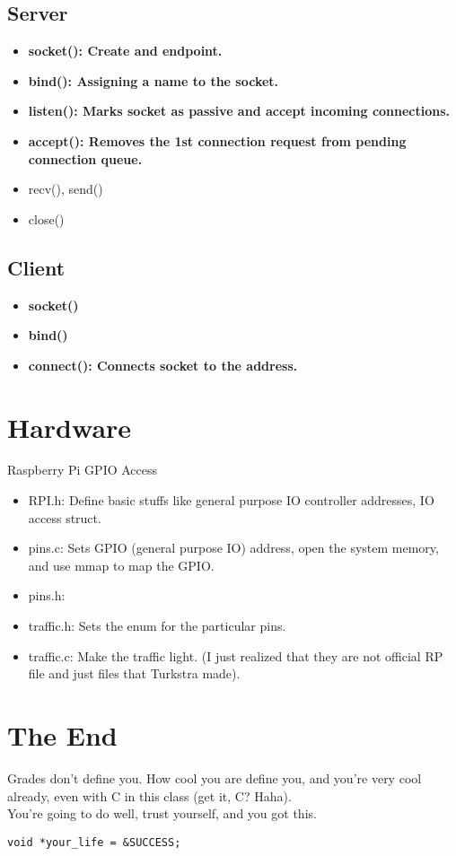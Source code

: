 \documentclass{article}
\begin{document}
\subsection{Server}
\begin{itemize}
    \item \textbf{socket(): Create and endpoint.}
    \item \textbf{bind(): Assigning a name to the socket.}
    \item \textbf{listen(): Marks socket as passive and accept incoming connections.}
    \item \textbf{accept(): Removes the 1st connection request from pending connection queue.}
    \item recv(), send()
    \item close()
\end{itemize}

\subsection{Client}
\begin{itemize}
    \item \textbf{socket()}
    \item \textbf{bind()}
    \item \textbf{connect(): Connects socket to the address.}
\end{itemize}

\section{Hardware}
Raspberry Pi GPIO Access
\begin{itemize}
    \item RPI.h: Define basic stuffs like general purpose IO controller addresses, IO access struct.
    \item pins.c: Sets GPIO (general purpose IO) address, open the system memory, and use mmap to map the GPIO.
    \item pins.h:
    \item traffic.h: Sets the enum for the particular pins.
    \item traffic.c: Make the traffic light. (I just realized that they are not official RP file and just files that Turkstra made).
\end{itemize}

\section{The End}
Grades don't define you. How cool you are define you, and you're very cool already, even with C in this class (get it, C? Haha).\\
You're going to do well, trust yourself, and you got this.
\begin{lstlisting}[style=CStyle]
    void *your_life = &SUCCESS;
\end{lstlisting}
\end{document}
